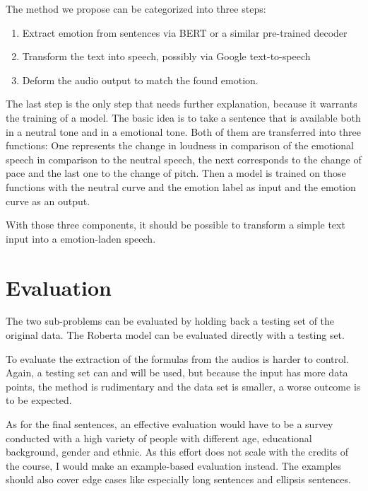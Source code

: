 \documentclass[12pt]{article}
\begin{document}
The method we propose can be categorized into three steps:
\begin{enumerate}
\item Extract emotion from sentences via BERT or a similar pre-trained decoder
\item Transform the text into speech, possibly via Google text-to-speech
\item Deform the audio output to match the found emotion.
\end{enumerate}

The last step is the only step that needs further explanation, because it warrants the training of a model. The basic idea is to take a sentence that is available both in a neutral tone and in a emotional tone. Both of them are transferred into three functions: One represents the change in loudness in comparison of the emotional speech in comparison to the neutral speech, the next corresponds to the change of pace and the last one to the change of pitch. Then a model is trained on those functions with the neutral curve and the emotion label as input and the emotion curve as an output.

With those three components, it should be possible to transform a simple text input into a emotion-laden speech.
\section{Evaluation}
The two sub-problems can be evaluated by holding back a testing set of the original data. The Roberta model can be evaluated directly with a testing set.

To evaluate the extraction of the formulas from the audios is harder to control. Again, a testing set can and will be used, but because the input has more data points, the method is rudimentary and the data set is smaller, a worse outcome is to be expected.

As for the final sentences, an effective evaluation would have to be a survey conducted with a high variety of people with different age, educational background, gender and ethnic. As this effort does not scale with the credits of the course, I would make an example-based evaluation instead.
The examples should also cover edge cases like especially long sentences and ellipsis sentences.
\end{document}

